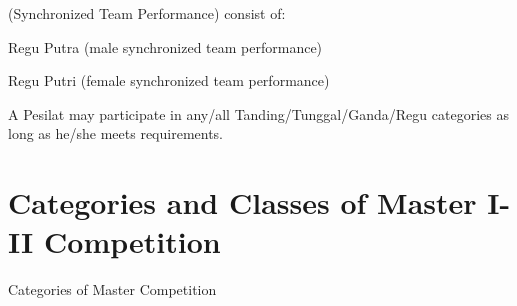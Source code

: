 \begin{legal}
\begin{legal}
    \item {} (Synchronized Team Performance) consist of:
        \begin{legal}
        \item Regu Putra (male synchronized team performance)
        \item Regu Putri (female synchronized team performance)
        \end{legal}
    \end{legal}


    A Pesilat may participate in any/all Tanding/Tunggal/Ganda/Regu categories as long as he/she 
    meets requirements.
\end{legal}

\section{Categories and Classes of Master I-II Competition}
\label{sec:master}
Categories of Master Competition

